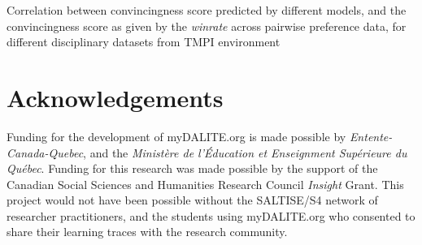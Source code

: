 \documentclass[notitlepage,12pt]{jedm}
\begin{document}
\begin{table}
	\parbox{.45\linewidth}{
		\centering
	
	}
	\hfill
	\parbox{.45\linewidth}{
		\centering
	
	}
	\caption{Correlation between convincingness score predicted by 
		different models, and the convincingness score as given by the 
		\textit{winrate} across pairwise preference data, for different 
		disciplinary datasets from TMPI environment
	}
\end{table}




\section{Acknowledgements}
Funding for the development of myDALITE.org is made possible by 
\textit{Entente-Canada-Quebec}, and the \textit{Ministère de l'Éducation et 
Enseignment Supérieure du Québec}. Funding for this research was made possible 
by the support of the Canadian Social Sciences and Humanities Research Council 
\textit{Insight} Grant. This project would not have been possible without the 
SALTISE/S4 network of researcher practitioners, and the students using 
myDALITE.org who consented to share their learning traces with the research 
community.

 




\end{document}
